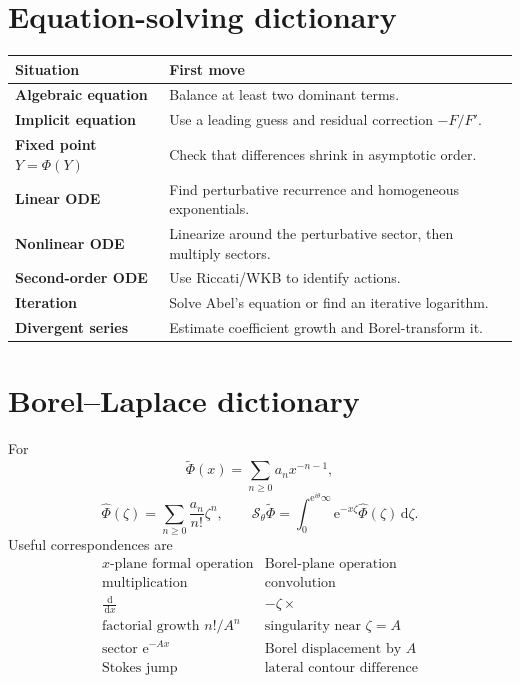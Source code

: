 \documentclass[11pt,oneside,openany]{book}
\newcommand{\e}{\mathrm{e}}
\newcommand{\dd}{\,\mathrm{d}}
\theoremstyle{plain}
\theoremstyle{definition}
\theoremstyle{remark}
\begin{document}
\section{Equation-solving dictionary}
\begin{center}
\begin{tabularx}{0.96\textwidth}{>{\bfseries}p{}X}
\toprule
Situation & First move\\
\midrule
Algebraic equation & Balance at least two dominant terms.\\
Implicit equation & Use a leading guess and residual correction $-F/F'$.\\
Fixed point $Y=\Phi(Y)$ & Check that differences shrink in asymptotic order.\\
Linear ODE & Find perturbative recurrence and homogeneous exponentials.\\
Nonlinear ODE & Linearize around the perturbative sector, then multiply sectors.\\
Second-order ODE & Use Riccati/WKB to identify actions.\\
Iteration & Solve Abel's equation or find an iterative logarithm.\\
Divergent series & Estimate coefficient growth and Borel-transform it.\\
\bottomrule
\end{tabularx}
\end{center}

\section{Borel--Laplace dictionary}
For
\[
  \widetilde\Phi(x)=\sum_{n\ge0}a_nx^{-n-1},
\]
\[
  \widehat\Phi(\zeta)=\sum_{n\ge0}\frac{a_n}{n!}\zeta^n,
  \qquad
  \mathcal S_\theta\widetilde\Phi
  =\int_0^{\e^{i\theta}\infty}\e^{-x\zeta}\widehat\Phi(\zeta)\dd\zeta.
\]
Useful correspondences are
\[
\begin{array}{c|c}
\text{$x$-plane formal operation}&\text{Borel-plane operation}\\
\hline
\text{multiplication}&\text{convolution}\\
\frac{\dd}{\dd x}&-\zeta\times\\
\text{factorial growth }n!/A^n&\text{singularity near }\zeta=A\\
\text{sector }\e^{-Ax}&\text{Borel displacement by }A\\
\text{Stokes jump}&\text{lateral contour difference}
\end{array}
\]
\end{document}
